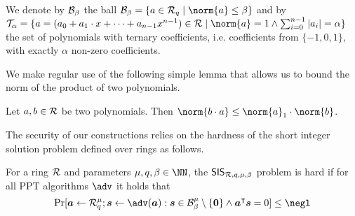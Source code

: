 We denote by $\mathcal{B}_\beta$ the ball $\ball_\beta = \{a\in\ring_q\mid \norm{a}\leq\beta\}$ and by $\tern_\alpha = \{a=(a_0+a_1\cdot x + \dots + a_{n-1}x^{n-1}) \in\ring \mid \norm{a}=1 \land \sum_{i=0}^{n-1} |a_i| = \alpha\}$ the set of polynomials with ternary coefficients, i.e. coefficients from $\{-1,0,1\}$, with exactly $\alpha$ non-zero coefficients.

We make regular use of the following simple lemma that allows us to bound the norm of the product of two polynomials.
\begin{lemma}\label{lem:ternbound}
  Let $a,b\in\mathcal{R}$ be two polynomials. Then $\norm{b\cdot a} \leq \norm{a}_1\cdot\norm{b}$.
\end{lemma}

The security of our constructions relies on the hardness of the short integer solution problem defined over rings as follows.
\begin{definition}
  For a ring $\mathcal{R}$ and parameters $\mu,q,\beta \in \NN$, the $\mathsf{SIS}_{\mathcal{R},q,\mu,\beta}$ problem is hard if for all PPT algorithms $\adv$ it holds that
  \[
    \Pr[
      \vec{a} \gets \ring_q^\mu; \vec{s}\gets\adv(\vec{a}) : \vec{s}\in\ball_\beta^\mu\setminus\{\vec{0}\} \land \vec{a}^\intercal\vec{s}=0
    ] \leq \negl
  \]
\end{definition}

